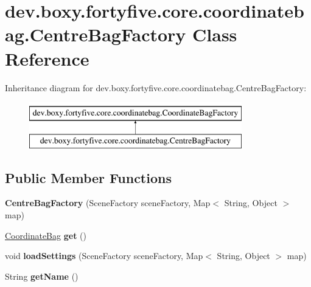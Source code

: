 \hypertarget{classdev_1_1boxy_1_1fortyfive_1_1core_1_1coordinatebag_1_1_centre_bag_factory}{
\section{dev.boxy.fortyfive.core.coordinatebag.CentreBagFactory Class Reference}
\label{d8/dc6/classdev_1_1boxy_1_1fortyfive_1_1core_1_1coordinatebag_1_1_centre_bag_factory}
}
Inheritance diagram for dev.boxy.fortyfive.core.coordinatebag.CentreBagFactory:\begin{figure}[H]
\begin{center}
\leavevmode
\includegraphics[height=2.000000cm]{d8/dc6/classdev_1_1boxy_1_1fortyfive_1_1core_1_1coordinatebag_1_1_centre_bag_factory}
\end{center}
\end{figure}
\subsection*{Public Member Functions}
\begin{DoxyCompactItemize}
\item 
\hypertarget{classdev_1_1boxy_1_1fortyfive_1_1core_1_1coordinatebag_1_1_centre_bag_factory_a9ae0edf244805be5c7a57fcd02944314}{
{\bfseries CentreBagFactory} (SceneFactory sceneFactory, Map$<$ String, Object $>$ map)}
\label{d8/dc6/classdev_1_1boxy_1_1fortyfive_1_1core_1_1coordinatebag_1_1_centre_bag_factory_a9ae0edf244805be5c7a57fcd02944314}

\item 
\hypertarget{classdev_1_1boxy_1_1fortyfive_1_1core_1_1coordinatebag_1_1_centre_bag_factory_ac4d2e95cd85e594c30f4fbaaecb4a845}{
\hyperlink{interfacedev_1_1boxy_1_1fortyfive_1_1core_1_1coordinatebag_1_1_coordinate_bag}{CoordinateBag} {\bfseries get} ()}
\label{d8/dc6/classdev_1_1boxy_1_1fortyfive_1_1core_1_1coordinatebag_1_1_centre_bag_factory_ac4d2e95cd85e594c30f4fbaaecb4a845}

\item 
\hypertarget{classdev_1_1boxy_1_1fortyfive_1_1core_1_1coordinatebag_1_1_centre_bag_factory_ad855727d5f592dba02a2d8952e98dcab}{
void {\bfseries loadSettings} (SceneFactory sceneFactory, Map$<$ String, Object $>$ map)}
\label{d8/dc6/classdev_1_1boxy_1_1fortyfive_1_1core_1_1coordinatebag_1_1_centre_bag_factory_ad855727d5f592dba02a2d8952e98dcab}

\item 
\hypertarget{classdev_1_1boxy_1_1fortyfive_1_1core_1_1coordinatebag_1_1_centre_bag_factory_a6d09017563d207beab8a56fd3f8e2b5c}{
String {\bfseries getName} ()}
\label{d8/dc6/classdev_1_1boxy_1_1fortyfive_1_1core_1_1coordinatebag_1_1_centre_bag_factory_a6d09017563d207beab8a56fd3f8e2b5c}

\end{DoxyCompactItemize}
